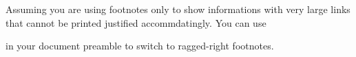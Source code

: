 \begin{Example}
  Assuming you are using footnotes only to show informations with very large
  links that cannot be printed justified accommdatingly. You can use
\begin{lstcode}
  \let\raggedfootnote\raggedright    
\end{lstcode}
  in your document preamble to switch to ragged-right footnotes.
\end{Example}%
\EndIndexGroup
%
\EndIndexGroup


